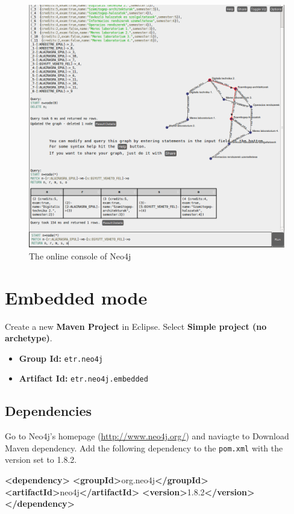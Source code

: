 \documentclass[]{report}
\newenvironment{Shaded}{}{}
\newcommand{\KeywordTok}[1]{\textcolor[rgb]{0.00,0.44,0.13}{\textbf{{#1}}}}
\newcommand{\NormalTok}[1]{{#1}}
\let\Oldincludegraphics\includegraphics
\renewcommand{\includegraphics}[1]{
\begin{adjustbox}{max size={\textwidth}{\textheight}}
    \Oldincludegraphics[scale=0.6]{#1}%
\end{adjustbox}
}
\begin{document}
\begin{figure}[htbp]
\centering
\includegraphics{img/nosql/online_console.png}
\caption{The online console of Neo4j}
\end{figure}

\section{Embedded mode}

Create a new \textbf{Maven Project} in Eclipse. Select \textbf{Simple
project (no archetype)}.

\begin{itemize}
\itemsep1pt\parskip0pt
\item
  \textbf{Group Id:} \texttt{etr.neo4j}
\item
  \textbf{Artifact Id:} \texttt{etr.neo4j.embedded}
\end{itemize}

\subsection{Dependencies}

Go to Neo4j's homepage (\url{http://www.neo4j.org/}) and naviagte to
Download \textbar{} Maven dependency. Add the following dependency to
the \texttt{pom.xml} with the version set to 1.8.2.

\begin{Shaded}
\begin{Highlighting}[]
\KeywordTok{<dependency>}
 \KeywordTok{<groupId>}\NormalTok{org.neo4j}\KeywordTok{</groupId>}
 \KeywordTok{<artifactId>}\NormalTok{neo4j}\KeywordTok{</artifactId>}
 \KeywordTok{<version>}\NormalTok{1.8.2}\KeywordTok{</version>}
\KeywordTok{</dependency>}
\end{Highlighting}
\end{Shaded}
\end{document}
